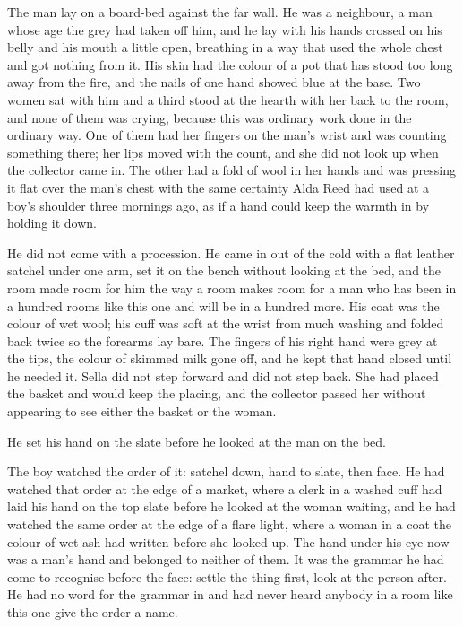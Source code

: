 \scenebreak

The man lay on a board-bed against the far wall. He was a neighbour, a man whose age the grey had taken off him, and he lay with his hands crossed on his belly and his mouth a little open, breathing in a way that used the whole chest and got nothing from it. His skin had the colour of a pot that has stood too long away from the fire, and the nails of one hand showed blue at the base. Two women sat with him and a third stood at the hearth with her back to the room, and none of them was crying, because this was ordinary work done in the ordinary way. One of them had her fingers on the man's wrist and was counting something there; her lips moved with the count, and she did not look up when the collector came in. The other had a fold of wool in her hands and was pressing it flat over the man's chest with the same certainty Alda Reed had used at a boy's shoulder three mornings ago, as if a hand could keep the warmth in by holding it down.

He did not come with a procession. He came in out of the cold with a flat leather satchel under one arm, set it on the bench without looking at the bed, and the room made room for him the way a room makes room for a man who has been in a hundred rooms like this one and will be in a hundred more. His coat was the colour of wet wool; his cuff was soft at the wrist from much washing and folded back twice so the forearms lay bare. The fingers of his right hand were grey at the tips, the colour of skimmed milk gone off, and he kept that hand closed until he needed it. Sella did not step forward and did not step back. She had placed the basket and would keep the placing, and the collector passed her without appearing to see either the basket or the woman.

He set his hand on the slate before he looked at the man on the bed.

The boy watched the order of it: satchel down, hand to slate, then face. He had watched that order at the edge of a market, where a clerk in a washed cuff had laid his hand on the top slate before he looked at the woman waiting, and he had watched the same order at the edge of a flare light, where a woman in a coat the colour of wet ash had written before she looked up. The hand under his eye now was a man's hand and belonged to neither of them. It was the grammar he had come to recognise before the face: settle the thing first, look at the person after. He had no word for the grammar in  and had never heard anybody in a room like this one give the order a name.

